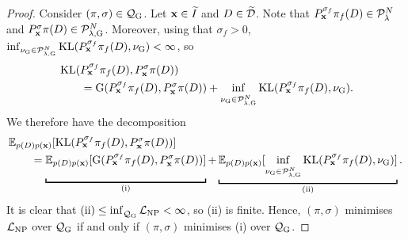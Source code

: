 \documentclass[12pt, twoside]{report}
\begin{document}
\begin{proof}
    Consider $(\pi, \sigma) \in \Qc\ss{G}$.
    Let $\mathbf{x} \in \widetilde{I}$ and $D \in \widetilde{\mathcal{D}}$.
    Note that $P^{\sigma_f}_{\mathbf{x}} \pi_f(D) \in \mathcal{P}_\lambda^N$ and $P_\vx^\sigma \pi(D) \in \Pc\ss{$\lambda$,G}^N$.
    Moreover, using that $\sigma_f > 0$, $\inf_{\nu\ss{G} \in \Pc\ss{$\lambda$,G}^N} \KL(P_\vx^{\sigma_f} \pi_f(D), \nu\ss{G}) < \infty$, so
    \begin{align}
        &\KL(P^{\sigma_f}_\vx \pi_f(D), P^{\sigma}_\vx \pi(D)) \nonumber \\
        &\qquad= \text{G}(P^{\sigma_f}_\vx \pi_f(D), P^{\sigma}_\vx \pi(D))
        + \inf_{\nu\ss{G} \in \Pc\ss{$\lambda$,G}^N} \KL(P^{\sigma_f}_\vx \pi_f(D), \nu\ss{G}).
    \end{align}
    We therefore have the decomposition
    \begin{align}
        &\E_{p(D)p(\vx)}[\KL(P^{\sigma_f}_\vx \pi_f(D), P^{\sigma}_\vx \pi(D))] \\
        &\qquad=
        \underbracket[1pt]{\E_{p(D)p(\vx)}[
            \vphantom{\inf_{\nu\ss{G} \in \Pc\ss{G}^N}}
            \text{G}(P^{\sigma_f}_\vx \pi_f(D), P^{\sigma}_\vx \pi(D))
        ]}_{\text{(i)}}
        +
        \underbracket[1pt]{\E_{p(D)p(\vx)}[
            \inf_{\nu\ss{G} \in \Pc\ss{$\lambda$,G}^N} \KL(P^{\sigma_f}_\vx \pi_f(D), \nu\ss{G})
        ]}_{\text{(ii)}}.
         \nonumber
    \end{align}
    It is clear that $\text{(ii)} \le \inf_{\Qc\ss{G}} \L\ss{NP} < \infty$, so (ii) is finite.
    Hence, $(\pi, \sigma)$ minimises $\L\ss{NP}$ over $\Qc\ss{G}$ if and only if $(\pi, \sigma)$ minimises (i) over $\Qc\ss{G}$.


\end{proof}
\end{document}
